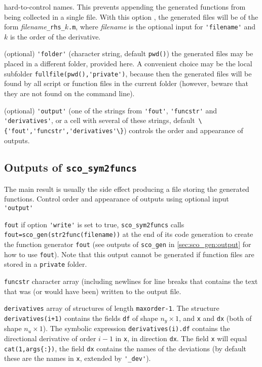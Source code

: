 \documentclass[11pt]{scrartcl}
\newcommand{\blist}[1]{\mbox{\lstinline!#1!}}
\newcommand{\mlvar}[1]{\lstinline[keywordstyle=\color{var}]!#1!}
\begin{document}
\begin{compactitem}
  hard-to-control names. This prevents appending the generated functions from being collected in a single file. With this option , the generated files will be of the form \textit{\textsf{filename}}\texttt{\_rhs\_}$k$\texttt{.m}, where \textit{\textsf{filename}} is the optional input for \blist{'filename'} and $k$ is the order of the derivative.
\item (optional) \blist{'folder'} (character string, default
  \blist{pwd()}) the generated files may be placed in a different
  folder, provided here. A convenient choice may be the local
  subfolder \blist{fullfile(pwd(),'private')}, because then the
  generated files will be found by all script or function files in the
  current folder (however, beware that they are not found on the
  command line).
\item (optional) \blist{'output'} (one of the strings from
  \blist{'fout'}, \blist{'funcstr'} and \blist{'derivatives'}, or a
  cell with several of these strings, default\ \blist{\{'fout','funcstr','derivatives'\}}) controls the order and
  appearance of outputs.
\end{compactitem}


\subsection{Outputs of \blist{sco_sym2funcs}}
The main result is usually the side effect producing a file storing
the generated functions. Control order and appearance of outputs using
optional input \blist{'output'}
\begin{compactitem}
\item \blist{fout} if option \blist{'write'} is set to true,
  \blist{sco_sym2funcs} calls \blist{fout=sco_gen(str2func(filename))}
  at the end of its code generation to create the function generator
  \blist{fout} (see outputs of \blist{sco_gen} in
  \cref{sec:sco_gen:output} for how to use \blist{fout}). Note that
  this output cannot be generated if function files are stored in a
  \texttt{private} folder.
\item \blist{funcstr} character array (including newlines for line
  breaks that contains the text that was (or would have been) written
  to the output file.
\item \blist{derivatives} array of structures of length
  \blist{maxorder-1}. The structure \blist{derivatives(i+1)} contains
  the fields \mlvar{df} of shape $n_y\times1$, and \mlvar{x} and
  \mlvar{dx} (both of shape $n_u\times1$). The symbolic expression
  \blist{derivatives(i).df} contains the directional derivative of
  order $i-1$ in \blist{x}, in direction \blist{dx}. The field
  \blist{x} will equal \blist{cat(1,args{:})}, the field \blist{dx}
  contains the names of the deviations (by default these are the names
  in \blist{x}, extended by \blist{'_dev'}).
\end{compactitem}
\end{document}
